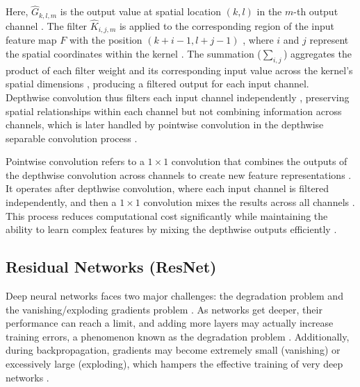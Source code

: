 Here, \(\hat{G}_{k,l,m}\) is the output value at spatial location \((k, l)\) in the \(m\)-th output channel \cite{howard2017mobilenetsefficientconvolutionalneural}. The filter \(\hat{K}_{i,j,m}\) is applied to the corresponding region of the input feature map \(F\) with the position \((k+i-1, l+j-1)\) \cite{howard2017mobilenetsefficientconvolutionalneural}, where \(i\) and \(j\) represent the spatial coordinates within the kernel \cite{howard2017mobilenetsefficientconvolutionalneural}. The summation (\(\sum_{i,j}\)) aggregates the product of each filter weight and its corresponding input value across the kernel's spatial dimensions \cite{howard2017mobilenetsefficientconvolutionalneural}, producing a filtered output for each input channel. Depthwise convolution thus filters each input channel independently \cite{howard2017mobilenetsefficientconvolutionalneural}, preserving spatial relationships within each channel but not combining information across channels, which is later handled by pointwise convolution in the depthwise separable convolution process \cite{howard2017mobilenetsefficientconvolutionalneural}.

Pointwise convolution refers to a \( 1 \times 1 \) convolution that combines the outputs of the depthwise convolution across channels to create new feature representations \cite{howard2017mobilenetsefficientconvolutionalneural}. It operates after depthwise convolution, where each input channel is filtered independently, and then a \( 1 \times 1 \) convolution mixes the results across all channels \cite{howard2017mobilenetsefficientconvolutionalneural}. This process reduces computational cost significantly while maintaining the ability to learn complex features by mixing the depthwise outputs efficiently \cite{he2015deepresiduallearningimage}.

\subsection{Residual Networks (ResNet)}

Deep neural networks faces two major challenges: the degradation problem and the vanishing/exploding gradients problem \cite{he2015deepresiduallearningimage}. As networks get deeper, their performance can reach a limit, and adding more layers may actually increase training errors, a phenomenon known as the degradation problem \cite{he2015deepresiduallearningimage}. Additionally, during backpropagation, gradients may become extremely small (vanishing) or excessively large (exploding), which hampers the effective training of very deep networks \cite{he2015deepresiduallearningimage}.


